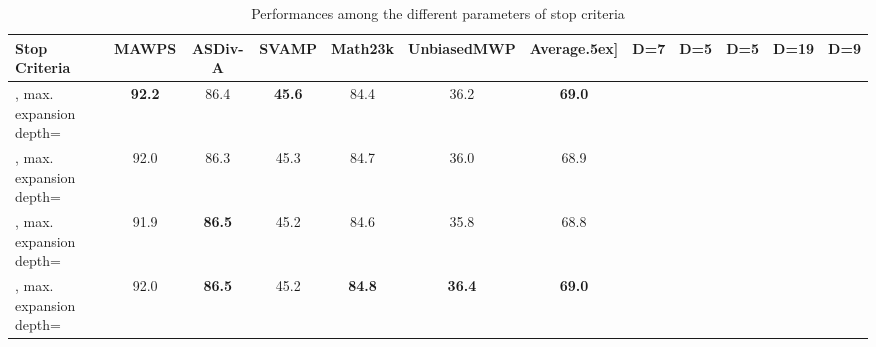 \documentclass[11pt]{article}
\newcommand{\1}{\mathbb{1}}
\begin{document}
\begin{table*}
    \centering
    \setlength{\tabcolsep}{2pt}
    \small
    \begin{tabular}{lccccc|c}
        \toprule
         \textbf{Stop Criteria} & \textbf{MAWPS} & \textbf{ASDiv-A} & \textbf{SVAMP} & \textbf{Math23k} & \textbf{UnbiasedMWP} & \textbf{Average}\-.5ex]
          & \tiny{D=7} & \tiny{D=5} & \tiny{D=5} & \tiny{D=19} &  \tiny{D=9} &  \\
         \midrule
         , max. expansion depth= & \textbf{92.2{\tiny{}}} & 86.4{\tiny{}} & \textbf{45.6{\tiny{}}} & 84.4{\tiny{}} & 36.2{\tiny{}} & \textbf{69.0} \\
         \midrule
         , max. expansion depth= & 92.0{\tiny{}} & 86.3{\tiny{}} & 45.3{\tiny{}} & 84.7{\tiny{}} & 36.0{\tiny{}} & 68.9 \\
         , max. expansion depth= & 91.9{\tiny{}} & \textbf{86.5{\tiny{}}} & 45.2{\tiny{}} & 84.6{\tiny{}} & 35.8{\tiny{}} & 68.8 \\
         , max. expansion depth= & 92.0{\tiny{}} & \textbf{86.5{\tiny{}}} & 45.2{\tiny{}} & \textbf{84.8{\tiny{}}} & \textbf{36.4{\tiny{}}} & \textbf{69.0} \\
        \midrule
    \end{tabular}
    \caption{Performances among the different parameters of stop criteria}
    \label{tab:stop}
\end{table*}
\end{document}
